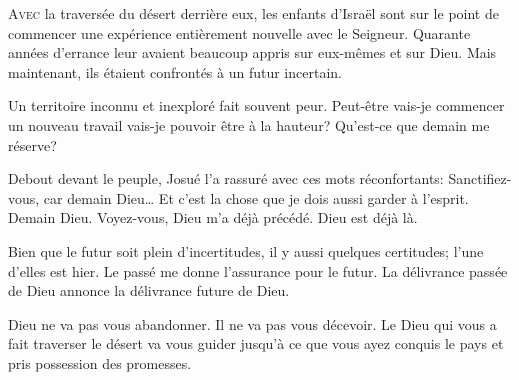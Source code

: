 





\lettrine{A}{vec} la traversée du désert derrière eux,
 les enfants d'Israël sont sur le point de commencer
 une expérience entièrement nouvelle avec le Seigneur.
 Quarante années d'errance leur avaient beaucoup appris
 sur eux-mêmes et sur Dieu.
 Mais maintenant, ils étaient confrontés à un futur incertain.

Un territoire inconnu et inexploré fait souvent peur.
 Peut-être vais-je commencer un nouveau travail
 \ocadr vais-je pouvoir être à la hauteur?
 Qu'est-ce que demain me réserve?

Debout devant le peuple, Josué l'a rassuré avec ces mots réconfortants:
 \Og Sanctifiez-vous, car demain Dieu\dots{} \Fg{}
 Et c'est la chose que je dois aussi garder à l'esprit.
 \Og Demain Dieu. \Fg{}
 Voyez-vous, Dieu m'a déjà précédé. Dieu est déjà là.

Bien que le futur soit plein d'incertitudes, il y aussi quelques certitudes; l'une d'elles est hier.
 Le passé me donne l'assurance pour le futur.
 La délivrance passée de Dieu annonce la délivrance future de Dieu.


Dieu ne va pas vous abandonner. Il ne va pas vous décevoir.
 Le Dieu qui vous a fait traverser le désert va vous guider
 jusqu'à ce que vous ayez conquis le pays et pris possession des promesses. 

\dvrule



